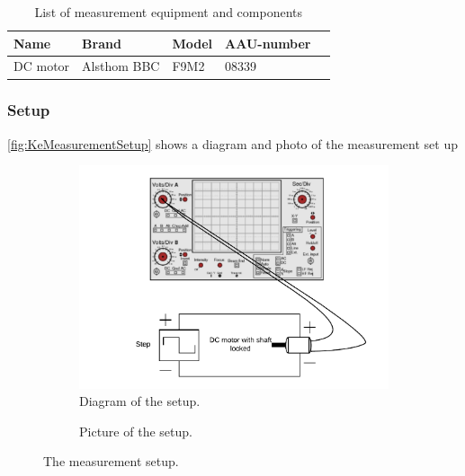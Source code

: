 \begin{table}[htbp]
	\centering
	\caption{List of measurement equipment and components}\label{tab_appendix:LaSetUp}
	
	\begin{tabularx}{\textwidth}{lXXXX}
		Name 				& Brand	& Model & AAU-number									\\ \toprule \rowcolor{lightGrey}
		
		DC motor & Alsthom BBC & F9M2 & 08339 
	\end{tabularx}
\end{table}


\subsubsection*{Setup}
\autoref{fig:KeMeasurementSetup} shows a diagram and photo of the measurement set up
\begin{figure}[htbp]
	\centering
	\begin{subfigure}{0.50\textwidth}
		\includegraphics[width=\textwidth]{figures/appendix/Motor&GearTests/RmLmDiagram}
		\caption{Diagram of the setup.} \label{fig:RmLmMeasurementDiagram}
	\end{subfigure}
	\begin{subfigure}{0.40\textwidth}
		\caption{Picture of the setup.} \label{fig:RmLmMeasurementPictures}
	\end{subfigure}
	\caption{The measurement setup.} \label{fig:RmLmMeasurementSetup}   
\end{figure}


